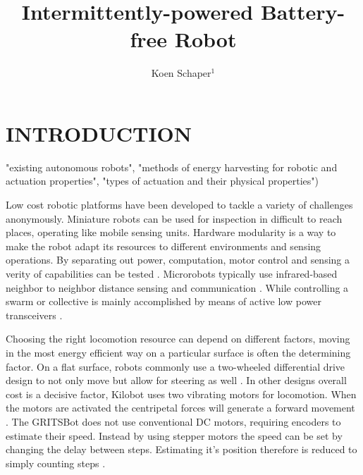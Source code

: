 \documentclass[letterpaper, 10 pt, conference]{ieeeconf}  %
\title{\LARGE \bf
Intermittently-powered Battery-free Robot
}
\author{Koen Schaper$^{1}$ %
}
\begin{document}
\maketitle
\thispagestyle{empty}
\pagestyle{empty}






\section{INTRODUCTION}

 "existing autonomous robots", 
 "methods of energy harvesting for robotic and actuation properties", 
 "types of actuation and their physical properties")


Low cost robotic platforms have been developed to tackle a variety of challenges anonymously.
Miniature robots can be used for inspection in difficult to reach places, operating like mobile sensing units.
Hardware modularity is a way to make the robot adapt its resources to different environments and sensing operations.
By separating out power, computation, motor control and sensing a verity of capabilities can be tested \cite{TinyTeRP, GRITSBot}.
Microrobots typically use infrared-based neighbor to neighbor distance sensing and communication \cite{Kilobot}.
While controlling a swarm or collective is mainly accomplished by means of active low power transceivers \cite{TinyTeRP, GRITSBot}. 


Choosing the right locomotion resource can depend on different factors, moving in the most energy efficient way on a particular surface is often the determining factor.
On a flat surface, robots commonly use a two-wheeled differential drive design to not only move but allow for steering as well \cite{TinyTeRP, GRITSBot}. 
In other designs overall cost is a decisive factor, Kilobot uses two vibrating motors for locomotion.
When the motors are activated the centripetal forces will generate a forward movement \cite{Kilobot}.
The GRITSBot does not use conventional DC motors, requiring encoders to estimate their speed. 
Instead by using stepper motors the speed can be set by changing the delay between steps. 
Estimating it's position therefore is reduced to simply counting steps \cite{GRITSBot}. 
\end{document}
